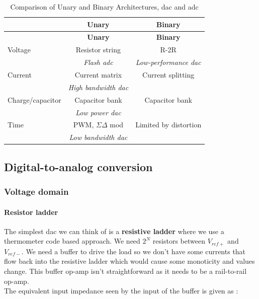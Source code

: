 \documentclass[
  a4paper,
]{article}
\begin{document}
\hypertarget{tab:unary_binary_comparison}{}
\begin{longtable}[]{@{}lcc@{}}
\caption{Comparison of Unary and Binary Architectures, {dac} and
{adc}}\tabularnewline
\toprule\noalign{}
& \textbf{Unary} & \textbf{Binary} \\
\midrule\noalign{}
\endfirsthead
\toprule\noalign{}
& \textbf{Unary} & \textbf{Binary} \\
\midrule\noalign{}
\endhead
\bottomrule\noalign{}
\endlastfoot
Voltage & Resistor string & R-2R \\
& \emph{Flash {adc}} & \emph{Low-performance {dac}} \\
Current & Current matrix & Current splitting \\
& \emph{High bandwidth {dac}} & \\
Charge/capacitor & Capacitor bank & Capacitor bank \\
& \emph{Low power {dac}} & \\
Time & PWM, \(\Sigma\Delta\) mod & Limited by distortion \\
& \emph{Low bandwidth {dac}} & \\
\end{longtable}

\hypertarget{digital-to-analog-conversion-1}{%
\subsection{Digital-to-analog
conversion}\label{digital-to-analog-conversion-1}}

\hypertarget{voltage-domain}{%
\subsubsection{Voltage domain}\label{voltage-domain}}

\hypertarget{resistor-ladder}{%
\paragraph{Resistor ladder}\label{resistor-ladder}}

The simplest {dac} we can think of is a \textbf{resistive ladder} where
we use a thermometer code based approach. We need \(2^N\) resistors
between \(V_{ref+}\) and \(V_{ref-}\). We need a buffer to drive the
load so we don't have some currents that flow back into the resistive
ladder which would cause some monoticity and values change. This buffer
op-amp isn't straightforward as it needs to be a rail-to-rail op-amp.\\
The equivalent input impedance seen by the input of the buffer is given
as :
\end{document}
